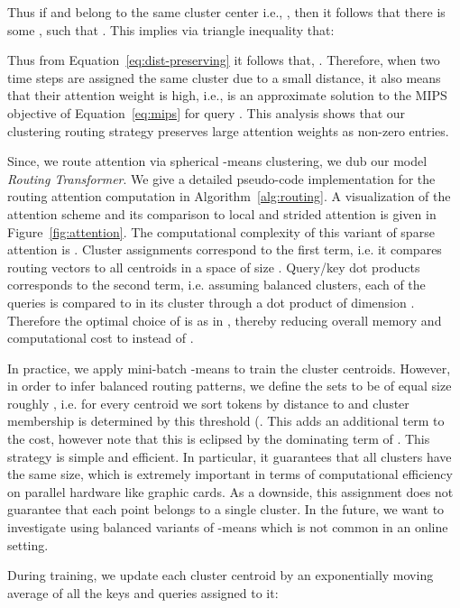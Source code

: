 \documentclass[a4paper]{article}
\begin{document}
Thus if  and  belong to the same cluster center 
i.e., ,
then it follows that there is some , such
that .
This implies via triangle inequality that:

Thus from Equation~\ref{eq:dist-preserving} it follows that,
.
Therefore, when two time steps  are assigned the same cluster due to 
a small  distance, 
it also means that their attention weight
 is high, i.e.,  is an approximate solution
to the MIPS objective of Equation~\ref{eq:mips} for query . 
This analysis shows that our clustering routing strategy 
preserves large attention weights as non-zero entries.

Since, we route attention via spherical -means clustering, we dub our model 
\emph{Routing Transformer}. We give a detailed pseudo-code
implementation for the routing attention computation
in Algorithm~\ref{alg:routing}.
A visualization of the attention scheme
and its comparison to local and strided attention is given 
in Figure~\ref{fig:attention}. The computational complexity of this 
variant of sparse attention is . 
Cluster assignments correspond to the first term, i.e. 
it compares  routing vectors to all  centroids in 
a space of size . Query/key dot products corresponds to 
the second term, i.e. assuming balanced clusters, each
of the  queries is compared to  in its cluster
through a dot product of dimension . Therefore the optimal 
choice of  is  as in \cite{child2019generating}, 
thereby reducing overall memory and computational
cost to  instead of  
\citep{vaswani2017attention}.

In practice, we apply mini-batch -means to train the cluster centroids.
However, in order to infer balanced routing patterns, we define the sets
 to be of equal size roughly , i.e. 
for every centroid  we sort tokens by distance to  and cluster 
membership is determined by this threshold (. This adds an
additional  term to the cost, however note that 
this is eclipsed by the dominating term of .
This strategy is simple and efficient. In particular, it guarantees that all clusters
have the same size, which is extremely important in terms of computational efficiency
on parallel hardware like graphic cards. As a downside, this assignment does not
guarantee that each point belongs to a single cluster.
In the future, we want to 
investigate using balanced variants of -means \citep{banerjee2004frequency,malinen2014balanced} 
which is not common in an online setting.

During training, we update each cluster centroid  by an exponentially moving average 
of all the keys
and queries assigned to it: 
\end{document}
